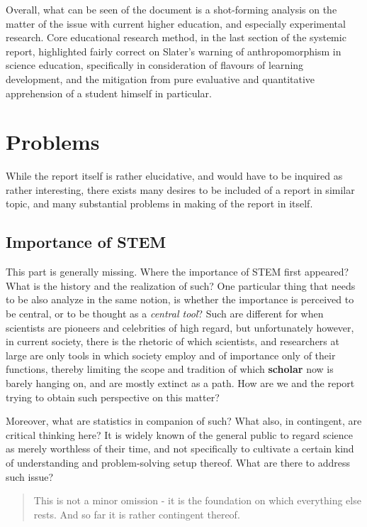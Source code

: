 \documentclass[10pt,a4paper]{article}
\begin{document}
Overall, what can be seen of the document is a shot-forming analysis on the matter of the issue with current higher education, and especially experimental research. Core educational research method, in the last section of the systemic report, highlighted fairly correct on Slater's warning of anthropomorphism in science education, specifically in consideration of flavours of learning development, and the mitigation from pure evaluative and quantitative apprehension of a student himself in particular. 

\section{Problems}

While the report itself is rather elucidative, and would have to be inquired as rather interesting, there exists many desires to be included of a report in similar topic, and many substantial problems in making of the report in itself. 

\subsection{Importance of STEM}

This part is generally missing. Where the importance of STEM first appeared? What is the history and the realization of such? One particular thing that needs to be also analyze in the same notion, is whether the importance is perceived to be central, or to be thought as a \textit{central tool}? Such are different for when scientists are pioneers and celebrities of high regard, but unfortunately however, in current society, there is the rhetoric of which scientists, and researchers at large are only tools in which society employ and of importance only of their functions, thereby limiting the scope and tradition of which \textbf{scholar} now is barely hanging on, and are mostly extinct as a path. How are we and the report trying to obtain such perspective on this matter?

Moreover, what are statistics in companion of such? What also, in contingent, are critical thinking here? It is widely known of the general public to regard science as merely worthless of their time, and not specifically to cultivate a certain kind of understanding and problem-solving setup thereof. What are there to address such issue?

\begin{quote}
     This is not a minor omission - it is the foundation on which everything else rests. And so far it is rather contingent thereof. 
\end{quote}
\end{document}
